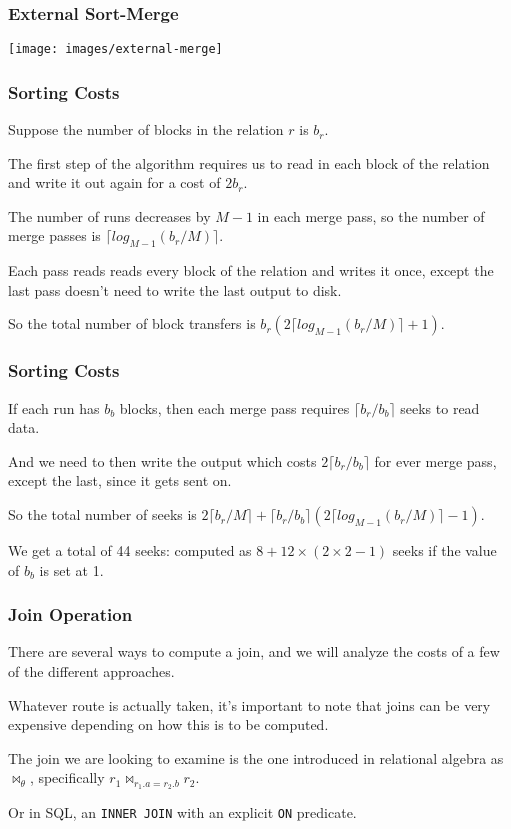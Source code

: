 \begin{frame}
\frametitle{External Sort-Merge}

\begin{center}
	\texttt{[image: images/external-merge]}
\end{center}

\end{frame}

\begin{frame}
\frametitle{Sorting Costs}

Suppose the number of blocks in the relation $r$ is $b_{r}$.


The first step of the algorithm requires us to read in each block of the relation and write it out again for a cost of $2b_{r}$. 

The number of runs decreases by $M-1$ in each merge pass, so the number of merge passes is $\lceil log_{M-1}(b_{r}/M)\rceil$. 

Each pass reads reads every block of the relation and writes it once, except the last pass doesn't need to write the last output to disk. 

So the total number of block transfers is $b_{r}(2\lceil log_{M-1}(b_{r}/M)\rceil + 1)$. 

\end{frame}

\begin{frame}
\frametitle{Sorting Costs}

If each run has $b_{b}$ blocks, then each merge pass requires $\lceil b_{r}/b_{b}\rceil$ seeks to read data. 

And we need to then write the output which costs  $2\lceil b_{r}/b_{b}\rceil$ for ever merge pass, except the last, since it gets sent on. 

So the total number of seeks is $2\lceil b_{r}/M\rceil + \lceil b_{r}/b_{b}\rceil(2 \lceil log_{M-1}(b_{r}/M)\rceil - 1)$.


We get a total of 44 seeks: computed as $8 + 12 \times (2 \times 2 - 1)$ seeks if the value of $b_{b}$ is set at 1.

\end{frame}

\begin{frame}
\frametitle{Join Operation}

There are several ways to compute a join, and we will analyze the costs of a few of the different approaches. 

Whatever route is actually taken, it's important to note that joins can be very expensive depending on how this is to be computed. 

The join we are looking to examine is the one introduced in relational algebra as $\Join_{\theta}$, specifically $r_{1} \Join_{r_{1}.a = r_{2}.b} r_{2}$.

Or in SQL, an \texttt{INNER JOIN} with an explicit \texttt{ON} predicate. 

\end{frame}

